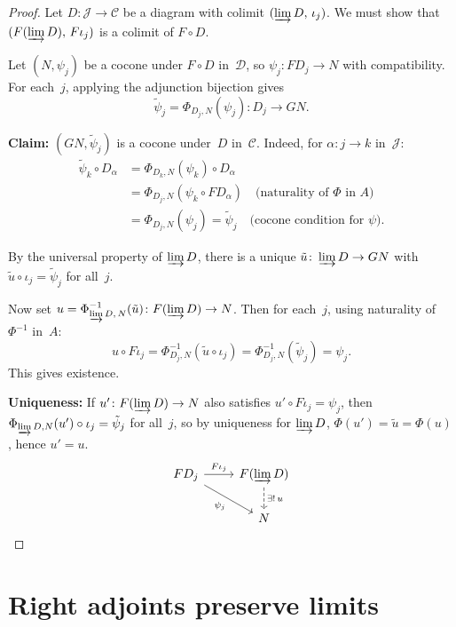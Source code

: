 \documentclass[a4paper,12pt]{book}
\theoremstyle{definition}
\theoremstyle{plain}
\theoremstyle{remark}
\begin{document}
\begin{proof}
Let $D\colon\mathcal{J}\to\mathcal{C}$ be a diagram with colimit
$(\varinjlim D,\,\iota_j)$.  We must show that
$(F(\varinjlim D),\,F\iota_j)$ is a colimit of $F\circ D$.

Let $(N,\psi_j)$ be a cocone under $F\circ D$ in~$\mathcal{D}$,
so $\psi_j\colon FD_j\to N$ with compatibility.
For each~$j$, applying the adjunction bijection gives
\[
    \tilde\psi_j = \Phi_{D_j,N}(\psi_j) \colon D_j \to GN.
\]

\textbf{Claim:} $(GN,\tilde\psi_j)$ is a cocone under~$D$ in~$\mathcal{C}$.
Indeed, for $\alpha\colon j\to k$ in~$\mathcal{J}$:
\begin{align*}
\tilde\psi_k\circ D_\alpha
&= \Phi_{D_k,N}(\psi_k)\circ D_\alpha \\
&= \Phi_{D_j,N}(\psi_k\circ FD_\alpha)
    \quad\text{(naturality of $\Phi$ in $A$)} \\
&= \Phi_{D_j,N}(\psi_j) = \tilde\psi_j
    \quad\text{(cocone condition for $\psi$)}.
\end{align*}

By the universal property of $\varinjlim D$, there is a unique
$\tilde u\colon\varinjlim D\to GN$ with
$\tilde u\circ\iota_j = \tilde\psi_j$ for all~$j$.

Now set $u = \Phi^{-1}_{\varinjlim D,\,N}(\tilde u)\colon F(\varinjlim D)\to N$.
Then for each~$j$, using naturality of~$\Phi^{-1}$ in~$A$:
\[
    u\circ F\iota_j
    = \Phi^{-1}_{D_j,N}(\tilde u\circ\iota_j)
    = \Phi^{-1}_{D_j,N}(\tilde\psi_j)
    = \psi_j.
\]
This gives existence.

\textbf{Uniqueness:}
If $u'\colon F(\varinjlim D)\to N$ also satisfies
$u'\circ F\iota_j = \psi_j$, then
$\Phi_{\varinjlim D,N}(u')\circ\iota_j = \tilde\psi_j$ for all~$j$,
so by uniqueness for $\varinjlim D$,
$\Phi(u') = \tilde u = \Phi(u)$, hence $u' = u$.
\[
\begin{tikzcd}
FD_j \arrow[r, "F\iota_j"] \arrow[dr, "\psi_j"']
& F(\varinjlim D) \arrow[d, dashed, "\exists!\, u"] \\
& N
\end{tikzcd}
\]
\end{proof}


\section{Right adjoints preserve limits}\label{sec:radj-lim}
\end{document}
